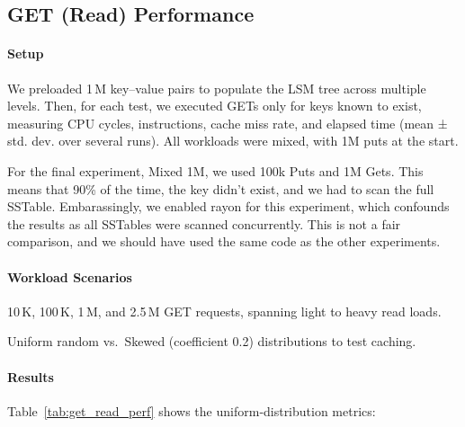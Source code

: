 \documentclass[10pt]{article}
\begin{document}
\subsection{GET (Read) Performance}

\paragraph{Setup}
We preloaded 1\,M key–value pairs to populate the LSM tree across multiple levels. Then, for each test, we executed GETs only for keys known to exist, measuring CPU cycles, instructions, cache miss rate, and elapsed time (mean ± std. dev. over several runs).
All workloads were mixed, with 1M puts at the start. 


For the final experiment, Mixed 1M, we used 100k Puts and 1M Gets. This means that 90\% of the time, the key didn't exist, and we had to scan the full SSTable.
Embarassingly, we enabled rayon for this experiment, which confounds the results as all SSTables were scanned concurrently. This is not a fair comparison, and we should have used the same code as the other experiments.

\paragraph{Workload Scenarios}
\begin{description}[leftmargin=1em,labelwidth=*,itemsep=0.5ex]
  \item[Query Volume] 10\,K, 100\,K, 1\,M, and 2.5\,M GET requests, spanning light to heavy read loads.
  \item[Access Skew] Uniform random vs.\ Skewed (coefficient 0.2) distributions to test caching.
\end{description}

\paragraph{Results}
Table~\ref{tab:get_read_perf} shows the uniform‐distribution metrics:
\end{document}
